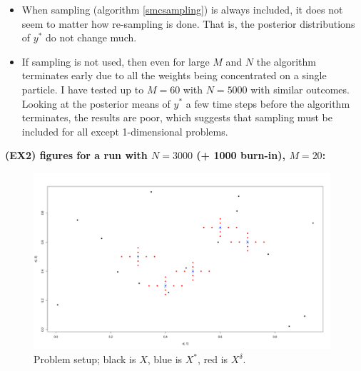 \documentclass{sfuthesis}
\begin{document}
\begin{itemize}
  \item When sampling (algorithm \ref{smcsampling}) is always included, it does not seem to matter how re-sampling is done. That is, the posterior distributions of $y^*$ do not change much.
  \item If sampling is not used, then even for large $M$ and $N$ the algorithm terminates early due to all the weights being concentrated on a single particle. I have tested up to $M = 60$ with $N = 5000$ with similar outcomes. Looking at the posterior means of $y^*$ a few time steps before the algorithm terminates, the results are poor, which suggests that sampling must be included for all except 1-dimensional problems. 

\end{itemize}

\textbf{(EX2) figures for a run with $N = 3000$ (+ 1000 burn-in), $M = 20$:}

\begin{figure}[H]
  \begin{center}
    \includegraphics[width=0.98\textwidth]{ex2given.png}
    \vspace{0.1mm}
    \caption{Problem setup; black is $X$, blue is $X^*$, red is $X^\delta$.}
    \label{ex2given}
  \end{center}
\end{figure}
\end{document}

